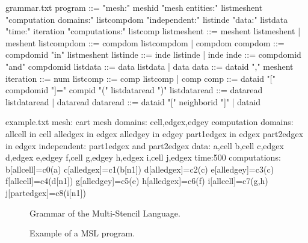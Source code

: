 
\begin{filecontents*}{grammar.txt}
program ::= "mesh:" meshid 
            "mesh entities:" listmeshent
            "computation domains:" 
                       listcompdom
            "independent:"
                       listinde
            "data:" listdata
            "time:" iteration
            "computations:" listcomp
listmeshent ::= meshent listmeshent
             |  meshent
listcompdom ::= compdom listcompdom
             |  compdom
compdom ::= compdomid "in" listmeshent
listinde ::= inde listinde
          |  inde
inde ::= compdomid "and" compdomid
listdata ::= data listdata
          |  data
data ::= dataid "," meshent
iteration ::= num
listcomp ::= comp listcomp
          |  comp
comp ::= dataid "[" compdomid "]=" compid
            "(" listdataread ")"
listdataread ::= dataread listdataread
              |  dataread
dataread ::= dataid "[" neighborid "]"
          |  dataid
\end{filecontents*}

\begin{filecontents*}{example.txt}
mesh: cart
mesh domains: cell,edgex,edgey
computation domains:
  allcell in cell
  alledgex in edgex
  alledgey in edgey
  part1edgex in edgex
  part2edgex in edgex
independent:
  part1edgex and part2edgex
data:
  a,cell
  b,cell
  c,edgex
  d,edgex
  e,edgey
  f,cell
  g,edgey
  h,edgex
  i,cell
  j,edgex
time:500
computations:
  b[allcell]=c0(a)
  c[alledgex]=c1(b[n1])
  d[alledgex]=c2(c)
  e[alledgey]=c3(c)
  f[allcell]=c4(d[n1])
  g[alledgey]=c5(e)
  h[alledgex]=c6(f)
  i[allcell]=c7(g,h)
  j[partedgex]=c8(i[n1])
\end{filecontents*}

\begin{figure}[t]
  \hspace{5mm}
  \begin{minipage}[t]{.49\textwidth}
    {}   
    \caption{Grammar of the Multi-Stencil Language. \label{fig:grammar}}
  \end{minipage}
\end{figure}

\begin{figure}[t]
\hspace{5mm}
  \begin{minipage}[t]{.49\textwidth}
    {}
    \caption{Example of a MSL program. \label{fig:mslex}}
      \end{minipage}
\end{figure}

